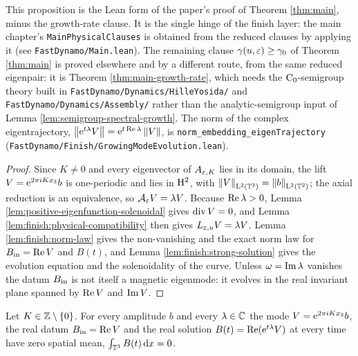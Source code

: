 This proposition is the Lean form of the paper's proof of Theorem \ref{thm:main}, minus the
growth-rate clause.  It is the single hinge of the finish layer: the main chapter's
\texttt{MainPhysicalClauses} is obtained from the reduced clauses by applying it (see
\texttt{FastDynamo/Main.lean}).  The remaining clause $\gamma(u,\varepsilon)\geq\gamma_0$ of Theorem
\ref{thm:main} is proved elsewhere and by a different route, from the same reduced eigenpair:
it is Theorem \ref{thm:main-growth-rate}, which needs the $\mathrm{C}_0$-semigroup theory built in
\texttt{FastDynamo/Dynamics/HilleYosida/} and \texttt{FastDynamo/Dynamics/Assembly/} rather
than the analytic-semigroup input of Lemma \ref{lem:semigroup-spectral-growth}.  The norm of the
complex eigentrajectory, $\left\|\mathrm{e}^{t\lambda}V\right\|=\mathrm{e}^{t\operatorname{Re}\lambda}\left\|V\right\|$, is
\texttt{norm\_embedding\_eigenTrajectory}
(\texttt{FastDynamo/Finish/GrowingModeEvolution.lean}).

\begin{proof}
  \leanok
  Since $K\neq0$ and every eigenvector of $A_{\varepsilon,K}$ lies in its domain, the lift
  $V=\mathrm{e}^{2\pi iKx_3}b$ is one-periodic and lies in $\mathrm{H}^2$, with
  $\left\|V\right\|_{\mathrm{L}^2(\mathbb{T}^3)}=\left\|b\right\|_{\mathrm{L}^2(\mathbb{T}^2)}$; the axial reduction is an equivalence, so
  $\mathcal{A}_\varepsilon V=\lambda V$.  Because $\operatorname{Re}\lambda>0$, Lemma
  \ref{lem:positive-eigenfunction-solenoidal} gives $\operatorname{div} V=0$, and Lemma
  \ref{lem:finish:physical-compatibility} then gives $L_{\varepsilon,u}V=\lambda V$.  Lemma
  \ref{lem:finish:norm-law} gives the non-vanishing and the exact norm law for
  $B_{\rm in}=\operatorname{Re} V$ and $B(t)$, and Lemma \ref{lem:finish:strong-solution} gives the evolution
  equation and the solenoidality of the curve.  Unless $\omega=\operatorname{Im}\lambda$ vanishes the datum
  $B_{\rm in}$ is not itself a magnetic eigenmode: it evolves in the real invariant plane spanned
  by $\operatorname{Re} V$ and $\operatorname{Im} V$.
\end{proof}

\begin{lemma}
  \label{lem:finish:zero-mean}
  \leanok
  Let $K\in\mathbb{Z}\setminus\{0\}$.  For every amplitude $b$ and every $\lambda\in\mathbb{C}$ the mode
  $V=\mathrm{e}^{2\pi iKx_3}b$, the real datum $B_{\rm in}=\operatorname{Re} V$ and the real solution
  $B(t)=\operatorname{Re}(\mathrm{e}^{t\lambda}V)$ at every time have zero spatial mean,
  $\int_{\mathbb{T}^3}B(t)\,\mathrm{d} x=0$.
\end{lemma}

